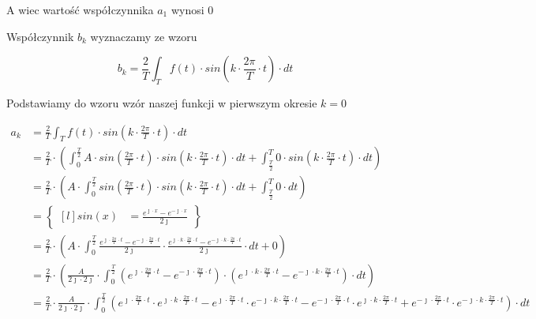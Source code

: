 \begin{task}
A wiec wartość współczynnika $a_1$ wynosi $0$

Współczynnik $b_k$ wyznaczamy ze wzoru

\begin{equation}
b_k=\frac{2}{T}\int_{T}f(t) \cdot sin\left( k \cdot \frac{2\pi}{T} \cdot t\right) \cdot dt
\end{equation}

Podstawiamy do wzoru wzór naszej funkcji w pierwszym okresie $k=0$

\begin{align*}
a_k&=\frac{2}{T}\int_{T}f(t) \cdot sin\left( k \cdot \frac{2\pi}{T} \cdot t\right) \cdot dt\\
&=\frac{2}{T}\cdot\left(\int_{0}^{\frac{T}{2}}A \cdot sin\left( \frac{2\pi}{T} \cdot t\right) \cdot sin\left( k \cdot \frac{2\pi}{T} \cdot t\right) \cdot dt+\int_{\frac{T}{2}}^{T} 0 \cdot sin\left( k \cdot \frac{2\pi}{T} \cdot t\right) \cdot dt\right)\\
&=\frac{2}{T}\cdot\left(A \cdot \int_{0}^{\frac{T}{2}}sin\left( \frac{2\pi}{T} \cdot t\right) \cdot sin\left( k \cdot \frac{2\pi}{T} \cdot t\right) \cdot dt+\int_{\frac{T}{2}}^{T} 0 \cdot dt\right)\\
&=\begin{Bmatrix*}[l]
sin\left(x\right)&=\frac{e^{\jmath \cdot x}-e^{-\jmath \cdot x}}{2 \jmath }
\end{Bmatrix*}\\
&=\frac{2}{T}\cdot\left(A \cdot \int_{0}^{\frac{T}{2}} \frac{e^{\jmath \cdot \frac{2\pi}{T} \cdot t}-e^{-\jmath \cdot \frac{2\pi}{T} \cdot t}}{2\jmath} \cdot \frac{e^{\jmath \cdot k \cdot \frac{2\pi}{T} \cdot t}-e^{-\jmath \cdot k \cdot \frac{2\pi}{T} \cdot t}}{2\jmath} \cdot dt+0\right)\\
&=\frac{2}{T}\cdot\left(\frac{A}{2\jmath\cdot 2\jmath} \cdot \int_{0}^{\frac{T}{2}} \left(e^{\jmath \cdot \frac{2\pi}{T} \cdot t}-e^{-\jmath \cdot \frac{2\pi}{T} \cdot t}\right)\cdot \left(e^{\jmath \cdot k \cdot \frac{2\pi}{T} \cdot t}-e^{-\jmath \cdot k \cdot \frac{2\pi}{T} \cdot t}\right) \cdot dt\right)\\
&=\frac{2}{T} \cdot \frac{A}{2\jmath\cdot 2\jmath} \cdot \int_{0}^{\frac{T}{2}}
\left(e^{\jmath \cdot \frac{2\pi}{T} \cdot t} \cdot e^{\jmath \cdot k \cdot \frac{2\pi}{T} \cdot t} - e^{\jmath \cdot \frac{2\pi}{T} \cdot t} \cdot e^{-\jmath \cdot k \cdot \frac{2\pi}{T} \cdot t} - e^{-\jmath \cdot \frac{2\pi}{T} \cdot t} \cdot e^{\jmath \cdot k \cdot \frac{2\pi}{T} \cdot t} + e^{-\jmath \cdot \frac{2\pi}{T} \cdot t} \cdot e^{-\jmath \cdot k \cdot \frac{2\pi}{T} \cdot t} \right) \cdot dt\\

\end{align*}
\end{task}
